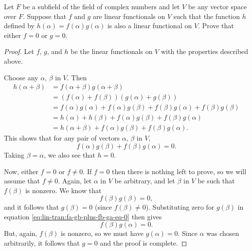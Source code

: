  Let $F$ be a subfield of the field of complex numbers
and let $V$ be any vector space over $F$. Suppose that $f$ and $g$ are
linear functionals on $V$ such that the function $h$ defined by
$h(\alpha) = f(\alpha)g(\alpha)$ is also a linear functional on
$V$. Prove that either $f = 0$ or $g = 0$.
\begin{proof}
  Let $f$, $g$, and $h$ be the linear functionals on $V$ with the
  properties described above.

  Choose any $\alpha$, $\beta$ in $V$. Then
  \begin{align*}
    h(\alpha + \beta)
    &= f(\alpha + \beta)g(\alpha + \beta) \\
    &= (f(\alpha) + f(\beta))(g(\alpha) + g(\beta)) \\
    &= f(\alpha)g(\alpha) + f(\alpha)g(\beta) + f(\beta)g(\alpha)
      + f(\beta)g(\beta) \\
    &= h(\alpha) + h(\beta) + f(\alpha)g(\beta) + f(\beta)g(\alpha) \\
    &= h(\alpha + \beta) + f(\alpha)g(\beta) + f(\beta)g(\alpha).
  \end{align*}
  This shows that for any pair of vectors $\alpha$, $\beta$ in $V$,
  \begin{equation}
    \label{eq:lin-tran:fa-gb-plus-fb-ga-eq-0}
    f(\alpha)g(\beta) + f(\beta)g(\alpha) = 0.
  \end{equation}
  Taking $\beta = \alpha$, we also see that $h = 0$.

  Now, either $f = 0$ or $f\neq0$. If $f = 0$ then there is nothing
  left to prove, so we will assume that $f\neq0$. Again, let $\alpha$
  in $V$ be arbitrary, and let $\beta$ in $V$ be such that $f(\beta)$
  is nonzero. We know that
  \begin{equation*}
    f(\beta)g(\beta) = 0,
  \end{equation*}
  and it follows that $g(\beta) = 0$ (since
  $f(\beta)\neq0$). Substituting zero for $g(\beta)$ in equation
  \eqref{eq:lin-tran:fa-gb-plus-fb-ga-eq-0} then gives
  \begin{equation*}
    f(\beta)g(\alpha) = 0.
  \end{equation*}
  But, again, $f(\beta)$ is nonzero, so we must have $g(\alpha) =
  0$. Since $\alpha$ was chosen arbitrarily, it follows that $g = 0$
  and the proof is complete.
\end{proof}
